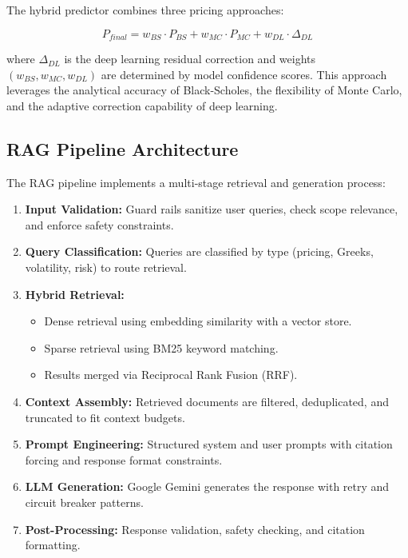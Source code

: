 \documentclass[12pt,a4paper]{report}
\begin{document}
The hybrid predictor combines three pricing approaches:

\begin{equation}
    P_{final} = w_{BS} \cdot P_{BS} + w_{MC} \cdot P_{MC} + w_{DL} \cdot \Delta_{DL}
\end{equation}

where $\Delta_{DL}$ is the deep learning residual correction and weights $(w_{BS}, w_{MC}, w_{DL})$ are determined by model confidence scores. This approach leverages the analytical accuracy of Black-Scholes, the flexibility of Monte Carlo, and the adaptive correction capability of deep learning.

\subsection{RAG Pipeline Architecture}

The RAG pipeline implements a multi-stage retrieval and generation process:

\begin{enumerate}
    \item \textbf{Input Validation:} Guard rails sanitize user queries, check scope relevance, and enforce safety constraints.
    \item \textbf{Query Classification:} Queries are classified by type (pricing, Greeks, volatility, risk) to route retrieval.
    \item \textbf{Hybrid Retrieval:}
    \begin{itemize}
        \item Dense retrieval using embedding similarity with a vector store.
        \item Sparse retrieval using BM25 keyword matching.
        \item Results merged via Reciprocal Rank Fusion (RRF).
    \end{itemize}
    \item \textbf{Context Assembly:} Retrieved documents are filtered, deduplicated, and truncated to fit context budgets.
    \item \textbf{Prompt Engineering:} Structured system and user prompts with citation forcing and response format constraints.
    \item \textbf{LLM Generation:} Google Gemini generates the response with retry and circuit breaker patterns.
    \item \textbf{Post-Processing:} Response validation, safety checking, and citation formatting.
\end{enumerate}
\end{document}

